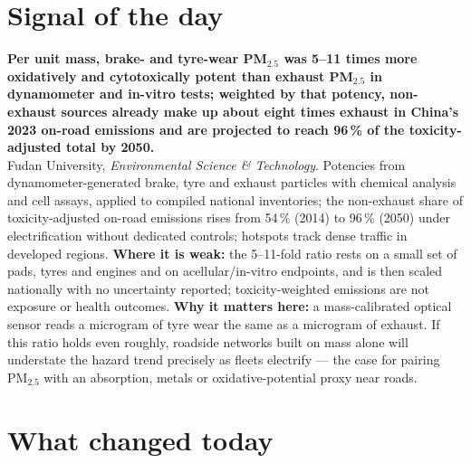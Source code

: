 \documentclass[10pt]{article}
\begin{document}
\vspace{6mm}

\section*{\sffamily\bfseries\color{Deep}Signal of the day}
\vspace{-1.5mm}{\color{Amber}\rule{\linewidth}{1.1pt}}\vspace{2.5mm}

\begin{keybox}
{\sffamily\bfseries\small\color{Deep}Per unit mass, brake- and tyre-wear PM$_{2.5}$ was 5--11 times more oxidatively and cytotoxically potent than exhaust PM$_{2.5}$ in dynamometer and in-vitro tests; weighted by that potency, non-exhaust sources already make up about eight times exhaust in China's 2023 on-road emissions and are projected to reach 96\,\% of the toxicity-adjusted total by 2050.}\\[1.4mm]
\footnotesize
Fudan University, \textit{Environmental Science \& Technology}. Potencies from dynamometer-generated brake, tyre and exhaust particles with chemical analysis and cell assays, applied to compiled national inventories; the non-exhaust share of toxicity-adjusted on-road emissions rises from 54\,\% (2014) to 96\,\% (2050) under electrification without dedicated controls; hotspots track dense traffic in developed regions.
\textbf{Where it is weak:} the 5--11-fold ratio rests on a small set of pads, tyres and engines and on acellular/in-vitro endpoints, and is then scaled nationally with no uncertainty reported; toxicity-weighted emissions are not exposure or health outcomes.
\textbf{Why it matters here:} a mass-calibrated optical sensor reads a microgram of tyre wear the same as a microgram of exhaust. If this ratio holds even roughly, roadside networks built on mass alone will understate the hazard trend precisely as fleets electrify --- the case for pairing PM$_{2.5}$ with an absorption, metals or oxidative-potential proxy near roads.\par
\end{keybox}

\vspace{3mm}

\section*{\sffamily\bfseries\color{Deep}What changed today}
\vspace{-1.5mm}{\color{Amber}\rule{\linewidth}{1.1pt}}\vspace{2.5mm}
\end{document}
